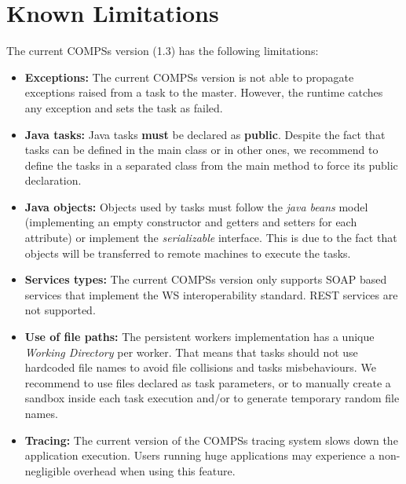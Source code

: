 \section{Known Limitations}
\label{sec:Known_Limitations}

The current COMPSs version (1.3) has the following limitations: 
\begin{itemize}
 \item \textbf{Exceptions:} \newline The current COMPSs version is not able to propagate exceptions raised from a task to the master. However, the runtime
 catches any exception and sets the task as failed.
 
 \item \textbf{Java tasks:} \newline Java tasks \textbf{must} be declared as \textbf{public}. Despite the fact that tasks can be
 defined in the main class or in other ones, we recommend to define the tasks in a separated class from the main method to force
 its public declaration.
 
 \item \textbf{Java objects:} \newline Objects used by tasks must follow the \textit{java beans} model (implementing an empty 
 constructor and getters and setters for each attribute) or implement the \textit{serializable} interface. This is due to the 
 fact that objects will be transferred to remote machines to execute the tasks.
 
 \item \textbf{Services types:} \newline The current COMPSs version only supports SOAP based services that implement the WS 
 interoperability standard. REST services are not supported.
 
 \item \textbf{Use of file paths:} \newline The persistent workers implementation has a unique \textit{Working Directory} per 
 worker. That means that tasks should not use hardcoded file names to avoid file collisions and tasks misbehaviours. We recommend to
 use files declared as task parameters, or to manually create a sandbox inside each task execution and/or to generate temporary 
 random file names. 
 
 \item \textbf{Tracing:} \newline The current version of the COMPSs tracing system slows down the application execution. Users
 running huge applications may experience a non-negligible overhead when using this feature. 
 

\end{itemize}
